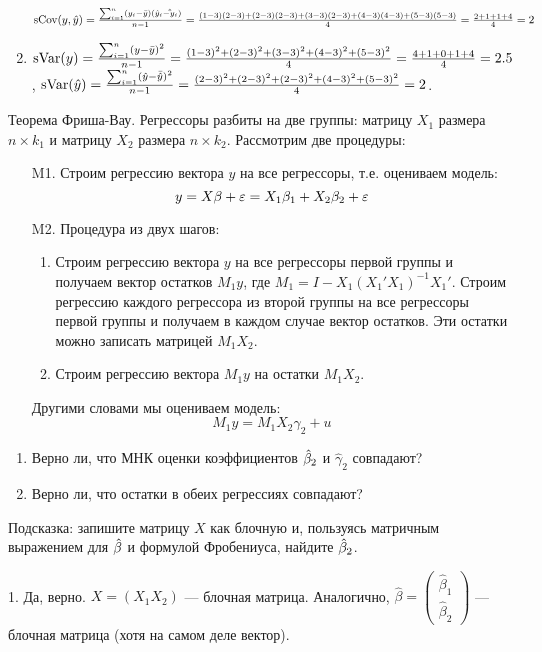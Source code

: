 \begin{problem}
\begin{sol}
\begin{enumerate}
 $\operatorname{sCov}(y,\hat{y})=\frac{\sum_{i=1}^n(y_i-\bar y)(\hat{y}_i-\hat \bar y_i)}{n-1}=\frac{(1-3)(2-3)+(2-3)(2-3)+(3-3)(2-3)+(4-3)(4-3)+(5-3)(5-3)}{4}=\frac{2+1+1+4}{4}=2$
\item $\operatorname{sVar}(y)=\frac{\sum_{i=1}^n(y-\bar y)^2}{n-1}=\frac{(1-3)^2+(2-3)^2+(3-3)^2+(4-3)^2+(5-3)^2}{4}=\frac{4+1+0+1+4}{4}=2.5$, $\operatorname{sVar}(\hat{y})=\frac{\sum_{i=1}^n(\hat{y}- \bar{\hat{y}})^2}{n-1}=\frac{(2-3)^2+(2-3)^2+(2-3)^2+(4-3)^2+(5-3)^2}{4}=2$.

\end{enumerate}
\end{sol}
\end{problem}



\begin{problem}
Теорема Фриша-Вау. Регрессоры разбиты на две группы: матрицу $X_1$ размера $n\times k_1$ и матрицу $X_2$ размера $n\times k_2$. Рассмотрим две процедуры:
\begin{enumerate}
\item[M1.] Строим регрессию вектора $y$ на все регрессоры, т.е. оцениваем модель:
\[
y=X\beta + \varepsilon = X_1 \beta_1 + X_2 \beta_2 +\varepsilon
\]
\item[M2.] Процедура из двух шагов:
\begin{enumerate}
\item Строим регрессию вектора $y$ на все регрессоры первой группы и получаем вектор остатков $M_1 y$, где $M_1=I-X_1(X_1'X_1)^{-1}X_1'$. Строим регрессию каждого регрессора из второй группы на все регрессоры первой группы и получаем в каждом случае вектор остатков. Эти остатки можно записать матрицей $M_1 X_2$.
\item Строим регрессию вектора $M_1 y$ на остатки $M_1 X_2$.
\end{enumerate}
Другими словами мы оцениваем модель:
\[
M_1 y = M_1 X_2 \gamma_2 + u
\]

\end{enumerate}
\begin{enumerate}
\item Верно ли, что МНК оценки коэффициентов $\hat{\beta}_2$ и $\hat{\gamma}_2$ совпадают?
\item Верно ли, что остатки в обеих регрессиях совпадают?
\end{enumerate}

\begin{sol}
Подсказка: запишите матрицу $X$ как блочную и, пользуясь матричным выражением для $\hat{\beta}$ и формулой Фробениуса, найдите $\hat{\beta}_2$.

1. Да, верно.
$X=(X_1 X_2)$ — блочная матрица. Аналогично, $\hat\beta=\left(\begin{array}{c}
\hat\beta_1\\
\hat\beta_2
\end{array}\right)$ — блочная матрица (хотя на самом деле вектор).


\end{sol}
\end{problem}
